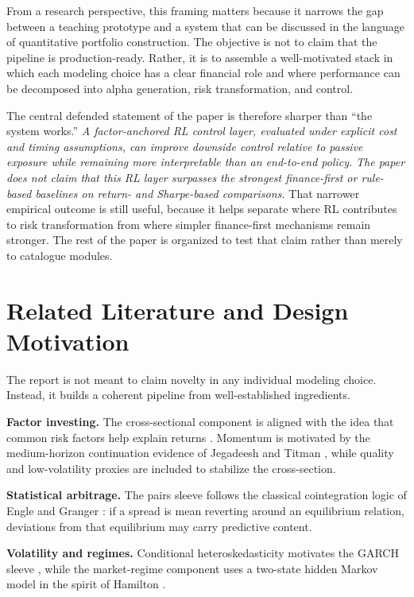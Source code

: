 \documentclass[11pt]{article}
\begin{document}
From a research perspective, this framing matters because it narrows the gap
between a teaching prototype and a system that can be discussed in the language
of quantitative portfolio construction. The objective is not to claim that the
pipeline is production-ready. Rather, it is to assemble a well-motivated stack
in which each modeling choice has a clear financial role and where performance
can be decomposed into alpha generation, risk transformation, and control.

The central defended statement of the paper is therefore sharper than ``the
system works.'' \emph{A factor-anchored RL control layer, evaluated under
explicit cost and timing assumptions, can improve downside control relative to
passive exposure while remaining more interpretable than an end-to-end policy.}
\emph{The paper does not claim that this RL layer surpasses the strongest
finance-first or rule-based baselines on return- and Sharpe-based comparisons.}
That narrower empirical outcome is still useful, because it helps separate
where RL contributes to risk transformation from where simpler finance-first
mechanisms remain stronger. The rest of the paper is organized to test that
claim rather than merely to catalogue modules.

\section{Related Literature and Design Motivation}

The report is not meant to claim novelty in any individual modeling choice.
Instead, it builds a coherent pipeline from well-established ingredients.

\textbf{Factor investing.} The cross-sectional component is aligned with the idea
that common risk factors help explain returns \cite{fama1993}. Momentum is
motivated by the medium-horizon continuation evidence of Jegadeesh and Titman
\cite{jegadeesh1993}, while quality and low-volatility proxies are included to
stabilize the cross-section.

\textbf{Statistical arbitrage.} The pairs sleeve follows the classical
cointegration logic of Engle and Granger \cite{engle1987}: if a spread is mean
reverting around an equilibrium relation, deviations from that equilibrium may
carry predictive content.

\textbf{Volatility and regimes.} Conditional heteroskedasticity motivates the
GARCH sleeve \cite{engle1982,bollerslev1986}, while the market-regime component
uses a two-state hidden Markov model in the spirit of Hamilton \cite{hamilton1989}.
\end{document}
